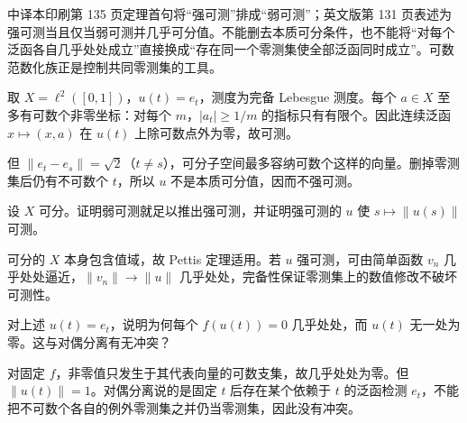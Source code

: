 \begin{remark}[原书校注与量词]
中译本印刷第 135 页定理首句将“强可测”排成“弱可测”；英文版第 131 页表述为强可测当且仅当弱可测并几乎可分值。不能删去本质可分条件，也不能将“对每个泛函各自几乎处处成立”直接换成“存在同一个零测集使全部泛函同时成立”。可数范数化族正是控制共同零测集的工具。
\end{remark}

\begin{example}[弱可测但不强可测]
取 $X=\ell^2([0,1])$，$u(t)=e_t$，测度为完备 Lebesgue 测度。每个 $a\in X$ 至多有可数个非零坐标：对每个 $m$，$|a_t|\ge1/m$ 的指标只有有限个。因此连续泛函 $x\mapsto(x,a)$ 在 $u(t)$ 上除可数点外为零，故可测。

但 $\|e_t-e_s\|=\sqrt2$（$t\ne s$），可分子空间最多容纳可数个这样的向量。删掉零测集后仍有不可数个 $t$，所以 $u$ 不是本质可分值，因而不强可测。
\end{example}

\begin{exercise}[可分目标空间]\label{ex:y5-separable-measurable}
设 $X$ 可分。证明弱可测就足以推出强可测，并证明强可测的 $u$ 使 $s\mapsto\|u(s)\|$ 可测。
\end{exercise}
\begin{solution}
可分的 $X$ 本身包含值域，故 Pettis 定理适用。若 $u$ 强可测，可由简单函数 $v_n$ 几乎处处逼近，$\|v_n\|\to\|u\|$ 几乎处处，完备性保证零测集上的数值修改不破坏可测性。
\end{solution}

\begin{exercise}[标量零不保证向量零]\label{ex:y5-nullsets}
对上述 $u(t)=e_t$，说明为何每个 $f(u(t))=0$ 几乎处处，而 $u(t)$ 无一处为零。这与对偶分离有无冲突？
\end{exercise}
\begin{solution}
对固定 $f$，非零值只发生于其代表向量的可数支集，故几乎处处为零。但 $\|u(t)\|=1$。对偶分离说的是固定 $t$ 后存在某个依赖于 $t$ 的泛函检测 $e_t$，不能把不可数个各自的例外零测集之并仍当零测集，因此没有冲突。
\end{solution}
